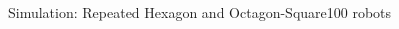 \begin{frame}{Simulation: Repeated Hexagon and Octagon-Square}{100 robots}
  \begin{columns}[T] %
    \begin{column}{.45\textwidth}
    \end{column}%
    \begin{column}{.45\textwidth}
    \end{column}%
  \end{columns}

  
\end{frame}